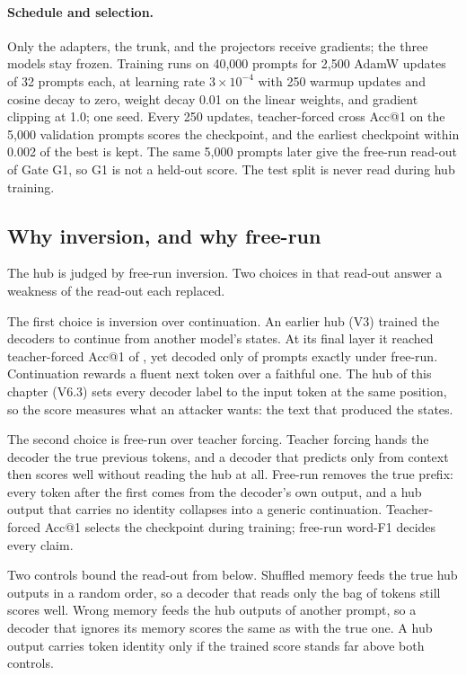 \paragraph{Schedule and selection.} Only the adapters, the trunk, and the projectors receive gradients; the three models stay frozen. Training runs on 40,000 prompts for 2,500 AdamW updates of 32 prompts each, at learning rate $3\times10^{-4}$ with 250 warmup updates and cosine decay to zero, weight decay 0.01 on the linear weights, and gradient clipping at 1.0; one seed. Every 250 updates, teacher-forced cross Acc@1 on the 5,000 validation prompts scores the checkpoint, and the earliest checkpoint within 0.002 of the best is kept. The same 5,000 prompts later give the free-run read-out of Gate G1, so G1 is not a held-out score. The test split is never read during hub training.

\subsection{Why inversion, and why free-run}\label{sec:hub:readout-choice}

The hub is judged by free-run inversion. Two choices in that read-out answer a weakness of the read-out each replaced.

The first choice is inversion over continuation. An earlier hub (V3) trained the decoders to continue from another model's states. At its final layer it reached teacher-forced Acc@1 of , yet decoded only  of prompts exactly under free-run. %
Continuation rewards a fluent next token over a faithful one. The hub of this chapter (V6.3) sets every decoder label to the input token at the same position, so the score measures what an attacker wants: the text that produced the states.

The second choice is free-run over teacher forcing. Teacher forcing hands the decoder the true previous tokens, and a decoder that predicts only from context then scores well without reading the hub at all. Free-run removes the true prefix: every token after the first comes from the decoder's own output, and a hub output that carries no identity collapses into a generic continuation. Teacher-forced Acc@1 selects the checkpoint during training; free-run word-F1 decides every claim.

Two controls bound the read-out from below. Shuffled memory feeds the true hub outputs in a random order, so a decoder that reads only the bag of tokens still scores well. Wrong memory feeds the hub outputs of another prompt, so a decoder that ignores its memory scores the same as with the true one. A hub output carries token identity only if the trained score stands far above both controls.


